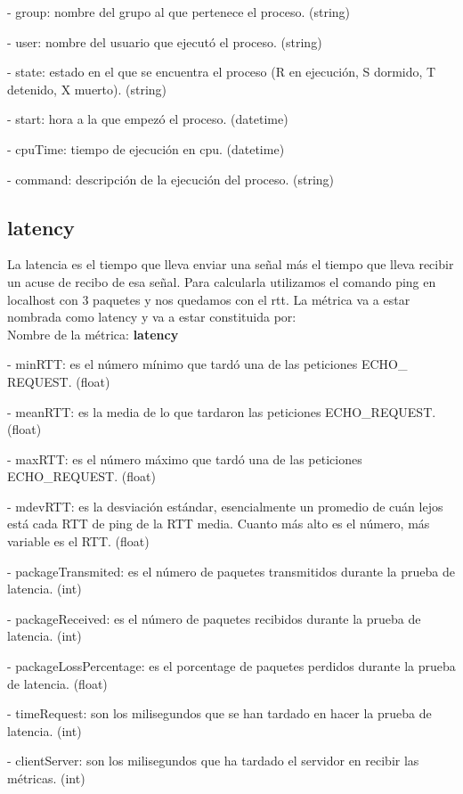 \documentclass[ spanish, a4paper, 12pt, oneside]{report}
\begin{document}
\hyp{} group: nombre del grupo al que pertenece el proceso. (string)

\hyp{} user: nombre del usuario que ejecutó el proceso. (string)

\hyp{} state: estado en el que se encuentra el proceso (R en ejecución, S dormido, T detenido, X muerto). (string)

\hyp{} start: hora a la que empezó el proceso. (datetime)
  
\hyp{} cpuTime: tiempo de ejecución en cpu. (datetime)
  
\hyp{} command: descripción de la ejecución del proceso. (string)


\subsection{latency}
La latencia es el tiempo que lleva enviar una señal más el tiempo que lleva recibir un acuse de recibo de esa señal.
Para calcularla utilizamos el comando ping en localhost con 3 paquetes y nos quedamos con el rtt. 
La métrica va a estar nombrada como latency y va a estar constituida por:\\
  
Nombre de la métrica: \textbf{latency}

\hyp{} minRTT: es el número mínimo que tardó una  de las peticiones ECHO\_ REQUEST. (float)

\hyp{} meanRTT: es la media de lo que tardaron las peticiones ECHO\_REQUEST. (float)

\hyp{} maxRTT: es el número máximo que tardó una de las peticiones ECHO\_REQUEST. (float)

\hyp{} mdevRTT: es la desviación estándar, esencialmente un promedio de cuán lejos está cada RTT de ping de la RTT media. 
Cuanto más alto es el número, más variable es el RTT. (float)

\hyp{} packageTransmited: es el número de paquetes transmitidos durante la prueba de latencia. (int)

\hyp{} packageReceived: es el número de paquetes recibidos durante la prueba de latencia. (int)

\hyp{} packageLossPercentage: es el porcentage de paquetes perdidos durante la prueba de latencia. (float)

\hyp{} timeRequest: son los milisegundos que se han tardado en hacer la prueba de latencia. (int)

\hyp{} clientServer: son los milisegundos que ha tardado el servidor en recibir las métricas. (int) 
\end{document}
